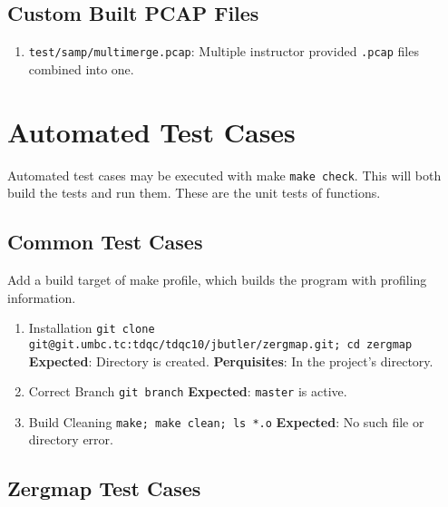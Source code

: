 \documentclass[12pt]{article}
\begin{document}
\subsection{Custom Built PCAP Files}
\begin{enumerate}
    \item \lstinline|test/samp/multimerge.pcap|:
        Multiple instructor provided \lstinline|.pcap| files combined into one.
    
\end{enumerate}

\section{Automated Test Cases}
Automated test cases may be executed with make \lstinline|make check|. This will both build the tests and run them. These are the unit tests of functions.

\subsection{Common Test Cases}

Add a build target of make profile, which builds the program with profiling information.

\hspace{8pt}
\begin{enumerate}
    \item Installation
    \newline
        \lstinline|git clone git@git.umbc.tc:tdqc/tdqc10/jbutler/zergmap.git; cd zergmap|
        \newline
            \textbf{Expected}: Directory is created.
            \newline
            \textbf{Perquisites}: In the project's directory.
    \item Correct Branch
    \newline
        \lstinline|git branch|
        \newline
            \textbf{Expected}: \lstinline|master| is active.
    \item Build Cleaning
    \newline
        \lstinline|make; make clean; ls *.o|
        \newline
            \textbf{Expected}: No such file or directory error.
\end{enumerate}

\subsection{Zergmap Test Cases}
\end{document}
